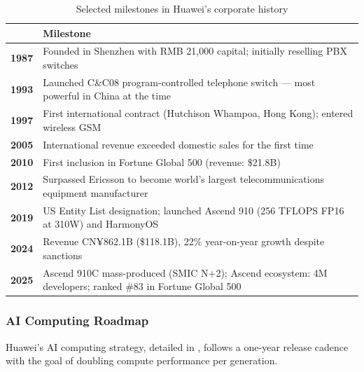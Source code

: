 \begin{table}[htbp]
  \centering
  \caption{Selected milestones in Huawei's corporate history}
  \label{tab:huawei-timeline}
  \begin{tabularx}{\textwidth}{>{\bfseries}lX}
    \toprule
    \tableheader{Year & Milestone} \\
    \midrule
    1987 & Founded in Shenzhen with RMB 21,000 capital; initially reselling PBX switches \\
    \rowcolor{TableRowOdd}
    1993 & Launched C\&C08 program-controlled telephone switch — most powerful in China at the time \\
    1997 & First international contract (Hutchison Whampoa, Hong Kong); entered wireless GSM \\
    \rowcolor{TableRowOdd}
    2005 & International revenue exceeded domestic sales for the first time \\
    2010 & First inclusion in Fortune Global 500 (revenue: \$21.8B) \\
    \rowcolor{TableRowOdd}
    2012 & Surpassed Ericsson to become world's largest telecommunications equipment manufacturer \\
    2019 & US Entity List designation; launched Ascend 910 (256 TFLOPS FP16 at 310W)
           and HarmonyOS \\
    \rowcolor{TableRowOdd}
    2024 & Revenue CN¥862.1B (\$118.1B), 22\% year-on-year growth despite sanctions \\
    2025 & Ascend 910C mass-produced (SMIC N+2); Ascend ecosystem: 4M developers;
           ranked \#83 in Fortune Global 500 \\
    \bottomrule
  \end{tabularx}
\end{table}


\subsubsection{AI Computing Roadmap}
\label{subsubsec:ai-roadmap}

Huawei's AI computing strategy, detailed in , follows a
one-year release cadence with the goal of doubling compute performance per
generation.

